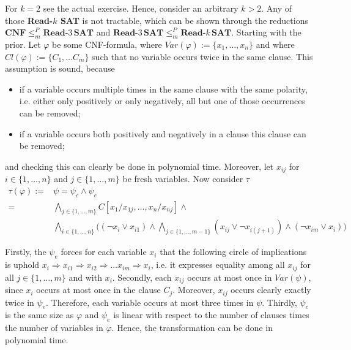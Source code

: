 \documentclass[11pt,a4paper]{article}
\begin{document}
\begin{enumerate}
\begin{itemize}
For $k=2$ see the actual exercise. Hence, consider an arbitrary $k>2$. Any of those {\bf Read-$k$ SAT} is not tractable, which can be shown through the reductions $\textbf{CNF} \leq_m^P\textbf{Read-}3 \,\textbf{SAT}$ and $\textbf{Read-}3\,\textbf{SAT} \leq_m^P\textbf{Read-}k \,\textbf{SAT}$. Starting with the prior. Let $\varphi$ be some CNF-formula, where $\mathit{Var}(\varphi):=\{x_1,\dots , x_n\}$ and where $\mathit{Cl}(\varphi):=\{C_1, \dots C_m\}$ such that no variable occurs twice in the same clause. This assumption is sound, because 
\begin{itemize}
\item  if a variable occurs multiple times in the same clause with the same polarity, i.e. either only positively or only negatively, all but one of those occurrences can be removed;
\item if a variable occurs both positively and negatively in a clause this clause can be removed;
\end{itemize}
and checking this can clearly be done in polynomial time.
Moreover, let $x_{ij}$ for $i \in \{1,\dots , n\}$ and $j \in \{1,\dots, m\}$ be fresh variables. Now consider $\tau$
\begin{equation*}
\begin{split}
\tau(\varphi) := & \psi = \psi_c \land \psi_e \\
= &\bigwedge_{j \in \{1,\dots , m\}} C[x_1 / x_{1j}, \dots , x_n / x_{nj}]  \land \\
& \bigwedge_{i \in \{1,\dots , n\}}  \big(   (\neg x_i \lor x_{i1})  \land  \bigwedge_{j \in \{1,\dots , m-1\}}  (x_{ij}  \lor \neg x_{i(j+1)})  \land (\neg x_{im} \lor x_{i})\big)
\end{split}
\end{equation*}

Firstly, the $ \psi_e$ forces for each variable $x_i$ that the following circle of implications is uphold $x_i \Rightarrow x_{i1} \Rightarrow  x_{i2} \Rightarrow \dots  x_{im} \Rightarrow x_i$, i.e. it expresses equality among all $x_{ij}$ for all $j\in \{1, \dots ,m\}$ and with $x_i$.
Secondly, each $x_{ij}$ occurs at most once in $\mathit{Var}(\psi)$, since $x_i$ occurs at most once in the clause $C_j$. Moreover, $x_{ij}$ occurs clearly exactly twice in $\psi_e$. Therefore, each variable occurs at most three times in $\psi$. 
Thirdly, $\psi_c$ is the same size as $\varphi$ and $\psi_e$ is linear with respect to the number of clauses times the number of variables in $\varphi$. Hence, the transformation can be done in polynomial time. \\


\end{itemize}
\end{enumerate}
\end{document}
